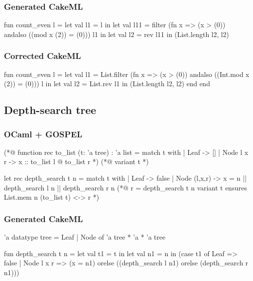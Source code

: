 \subsubsection*{Generated CakeML}

\begin{cakeml}
fun count_even l =
  let val l1 = l in
  let val l11 = filter (fn x => (x > (0)) andalso ((mod x (2)) = (0))) l1 in
  let val l2 = rev l11 in (List.length l2, l2)
\end{cakeml}

\subsubsection*{Corrected CakeML}

\begin{cakeml}
fun count_even l =
  let val l1 = List.filter (fn x => (x > (0)) andalso ((Int.mod x (2)) = (0))) l in
  let val l2 = List.rev l1 in (List.length l2, l2) end end
\end{cakeml}

\newpage

\subsection{Depth-search tree}
\label{subsec:Depth_search_tree}

\subsubsection*{OCaml + GOSPEL}

\begin{gospell}
(*@ function rec to_list (t: 'a tree) : 'a list = 
  match t with
  | Leaf -> []
  | Node l x r -> x :: to_list l @ to_list r
*)
(*@
  variant t
*)

let rec depth_search t n = 
  match t with
  | Leaf -> false
  | Node (l,x,r) -> x = n || depth_search l n || depth_search r n
(*@
  r = depth_search t n
  variant t
  ensures List.mem n (to_list t) <-> r
*)
\end{gospell}

\subsubsection*{Generated CakeML}

\begin{cakeml}
'a datatype tree = Leaf | Node of 'a tree * 'a * 'a tree

fun depth_search t n = let val t1 = t in
  let val n1 = n in
  (case t1 of
    Leaf => false
  | Node l x r =>
    (x = n1) orelse ((depth_search l n1) orelse (depth_search r n1)))
\end{cakeml}

